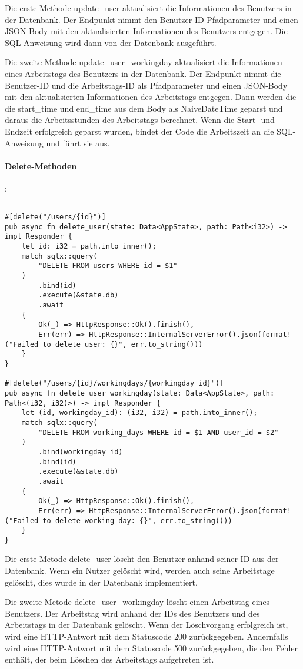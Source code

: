 Die erste Methode update\_user aktualisiert die Informationen des Benutzers in der Datenbank. Der Endpunkt nimmt den Benutzer-ID-Pfadparameter und einen JSON-Body mit den aktualisierten Informationen des Benutzers entgegen. Die SQL-Anweisung wird dann von der Datenbank ausgeführt.

Die zweite Methode update\_user\_workingday aktualisiert die Informationen eines Arbeitstags des Benutzers in der Datenbank. Der Endpunkt nimmt die Benutzer-ID und die Arbeitstags-ID als Pfadparameter und einen JSON-Body mit den aktualisierten Informationen des Arbeitstags entgegen. Dann werden die die start\_time und end\_time aus dem Body als NaiveDateTime geparst und daraus die Arbeitsstunden des Arbeitstags berechnet. Wenn die Start- und Endzeit erfolgreich geparst wurden, bindet der Code die Arbeitszeit an die SQL-Anweisung und führt sie aus. 
\paragraph{Delete-Methoden}:
\begin{verbatim}

#[delete("/users/{id}")]
pub async fn delete_user(state: Data<AppState>, path: Path<i32>) -> impl Responder {
    let id: i32 = path.into_inner();
    match sqlx::query(
        "DELETE FROM users WHERE id = $1"
    )
        .bind(id)
        .execute(&state.db)
        .await
    {
        Ok(_) => HttpResponse::Ok().finish(),
        Err(err) => HttpResponse::InternalServerError().json(format!("Failed to delete user: {}", err.to_string()))
    }
}

#[delete("/users/{id}/workingdays/{workingday_id}")]
pub async fn delete_user_workingday(state: Data<AppState>, path: Path<(i32, i32)>) -> impl Responder {
    let (id, workingday_id): (i32, i32) = path.into_inner();
    match sqlx::query(
        "DELETE FROM working_days WHERE id = $1 AND user_id = $2"
    )
        .bind(workingday_id)
        .bind(id)
        .execute(&state.db)
        .await
    {
        Ok(_) => HttpResponse::Ok().finish(),
        Err(err) => HttpResponse::InternalServerError().json(format!("Failed to delete working day: {}", err.to_string()))
    }
}
\end{verbatim}
Die erste Metode delete\_user löscht den Benutzer anhand seiner ID aus der Datenbank. Wenn ein Nutzer gelöscht wird, werden auch seine Arbeitstage gelöscht, dies wurde in der Datenbank implementiert.

Die zweite Metode delete\_user\_workingday löscht einen Arbeitstag eines Benutzers. Der Arbeitstag wird anhand der IDs des Benutzers und des Arbeitstags in der Datenbank gelöscht. Wenn der Löschvorgang erfolgreich ist, wird eine HTTP-Antwort mit dem Statuscode 200 zurückgegeben. Andernfalls wird eine HTTP-Antwort mit dem Statuscode 500 zurückgegeben, die den Fehler enthält, der beim Löschen des Arbeitstags aufgetreten ist.